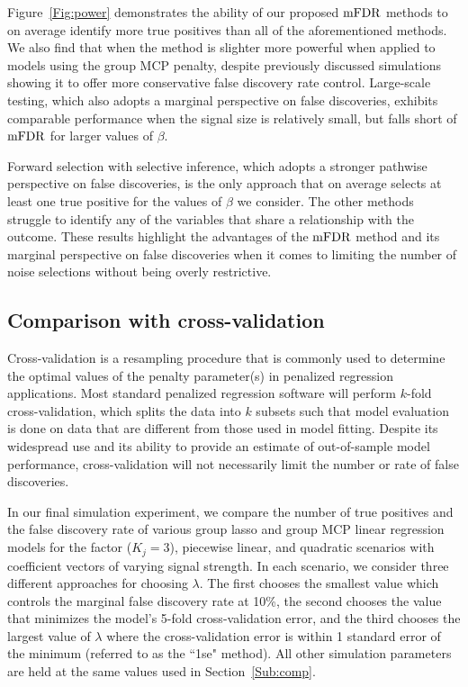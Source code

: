 Figure~\ref{Fig:power} demonstrates the ability of our proposed $\textrm{mFDR}$ methods to on average identify more true positives than all of the aforementioned methods. We also find that when the method is slighter more powerful when applied to models using the group MCP penalty, despite previously discussed simulations showing it to offer more conservative false discovery rate control.  Large-scale testing, which also adopts a marginal perspective on false discoveries, exhibits comparable performance when the signal size is relatively small, but falls short of $\textrm{mFDR}$ for larger values of $\beta$. 

Forward selection with selective inference, which adopts a stronger pathwise perspective on false discoveries, is the only approach that on average selects at least one true positive for the values of $\beta$ we consider.  The other methods struggle to identify any of the variables that share a relationship with the outcome. These results highlight the advantages of the $\textrm{mFDR}$ method and its marginal perspective on false discoveries when it comes to limiting the number of noise selections without being overly restrictive.

\subsection{Comparison with cross-validation}

Cross-validation is a resampling procedure that is commonly used to determine the optimal values of the penalty parameter(s) in penalized regression applications. Most standard penalized regression software will perform $k$-fold cross-validation, which splits the data into $k$ subsets such that model evaluation is done on data that are different from those used in model fitting. Despite its widespread use and its ability to provide an estimate of out-of-sample model performance, cross-validation will not necessarily limit the number or rate of false discoveries.

In our final simulation experiment, we compare the number of true positives and the false discovery rate of various group lasso and group MCP linear regression models for the factor ($K_j = 3$), piecewise linear, and quadratic scenarios with coefficient vectors of varying signal strength. In each scenario, we consider three different approaches for choosing $\lambda$.  The first chooses the smallest value which controls the marginal false discovery rate at 10\%, the second chooses the value that minimizes the model's 5-fold cross-validation error, and the third chooses the largest value of $\lambda$ where the cross-validation error is within 1 standard error of the minimum (referred to as the ``1se" method).  All other simulation parameters are held at the same values used in Section~\ref{Sub:comp}.

